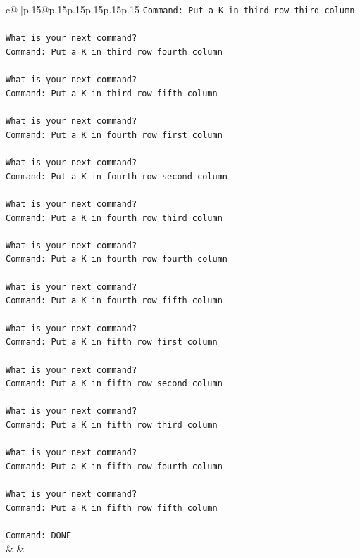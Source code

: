 \documentclass{article}
\begin{document}
{\begin{supertabular}{c@{$\;$}|p{.15\linewidth}@{}p{.15\linewidth}p{.15\linewidth}p{.15\linewidth}p{.15\linewidth}p{.15\linewidth}}
{{{\texttt{Command: Put a K in third row third column} \\
\\ 
\texttt{What is your next command?} \\
\texttt{Command: Put a K in third row fourth column} \\
\\ 
\texttt{What is your next command?} \\
\texttt{Command: Put a K in third row fifth column} \\
\\ 
\texttt{What is your next command?} \\
\texttt{Command: Put a K in fourth row first column} \\
\\ 
\texttt{What is your next command?} \\
\texttt{Command: Put a K in fourth row second column} \\
\\ 
\texttt{What is your next command?} \\
\texttt{Command: Put a K in fourth row third column} \\
\\ 
\texttt{What is your next command?} \\
\texttt{Command: Put a K in fourth row fourth column} \\
\\ 
\texttt{What is your next command?} \\
\texttt{Command: Put a K in fourth row fifth column} \\
\\ 
\texttt{What is your next command?} \\
\texttt{Command: Put a K in fifth row first column} \\
\\ 
\texttt{What is your next command?} \\
\texttt{Command: Put a K in fifth row second column} \\
\\ 
\texttt{What is your next command?} \\
\texttt{Command: Put a K in fifth row third column} \\
\\ 
\texttt{What is your next command?} \\
\texttt{Command: Put a K in fifth row fourth column} \\
\\ 
\texttt{What is your next command?} \\
\texttt{Command: Put a K in fifth row fifth column} \\
\\ 
\texttt{Command: DONE} \\
            }
        }
    }
    & & \\ \\


\end{supertabular}}
\end{document}
